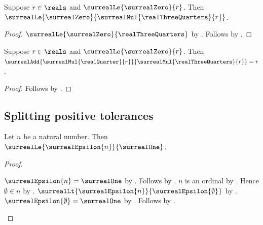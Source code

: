\begin{proposition}\label{real_three_quarters_scale_nonnegative}
    Suppose $r\in\reals$ and $\surrealLe{\surrealZero}{r}$.
    Then
        $\surrealLe{\surrealZero}{\surrealMul{\realThreeQuarters}{r}}$.
\end{proposition}
\begin{proof}
    $\surrealLe{\surrealZero}{\realThreeQuarters}$ by
        .
    Follows by
        .
\end{proof}

\begin{proposition}\label{real_quarter_spending_identity}
    Suppose $r\in\reals$ and $\surrealLe{\surrealZero}{r}$.
    Then
        $\surrealAdd{\surrealMul{\realQuarter}{r}}
            {\surrealMul{\realThreeQuarters}{r}}=r$.
\end{proposition}
\begin{proof}
    Follows by
        .
\end{proof}

\subsection{Splitting positive tolerances}

\begin{proposition}\label{surreal_epsilon_le_one}
    Let $n$ be a natural number.
    Then $\surrealLe{\surrealEpsilon{n}}{\surrealOne}$.
\end{proposition}
\begin{proof}
    \begin{byCase}
        $\surrealEpsilon{n}=\surrealOne$
            by .
        Follows by
            .
        $n$ is an ordinal by .
        Hence $\emptyset\in n$
            by .
        $\surrealLt{\surrealEpsilon{n}}{\surrealEpsilon{\emptyset}}$
            by .
        $\surrealEpsilon{\emptyset}=\surrealOne$
            by .
        Follows by .
    \end{byCase}
\end{proof}

